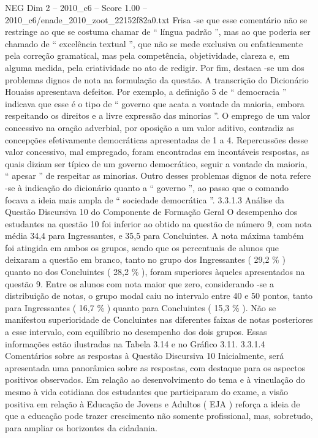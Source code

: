 \begin{textsample}{NEG Dim 2 – 2010\_c6 – Score 1.00 – 2010\_c6/enade\_2010\_zoot\_22152f82a0.txt}
Frisa -se que esse comentário não se restringe ao que se costuma chamar de “ língua padrão ”, mas ao que poderia ser chamado de “ excelência textual ”, que não se mede exclusiva ou enfaticamente pela correção gramatical, mas pela competência, objetividade, clareza e, em alguma medida, pela criatividade no ato de redigir.
Por fim, destaca -se um dos problemas dignos de nota na formulação da questão.
A transcrição do Dicionário Houaiss apresentava defeitos.
Por exemplo, a definição 5 de “ democracia ” indicava que esse é o tipo de “ governo que acata a vontade da maioria, embora respeitando os direitos e a livre expressão das minorias ”.
O emprego de um valor concessivo na oração adverbial, por oposição a um valor aditivo, contradiz as concepções efetivamente democráticas apresentadas de 1 a 4.
Repercussões desse valor concessivo, mal empregado, foram encontradas em incontáveis respostas, as quais diziam ser típico de um governo democrático, seguir a vontade da maioria, “ apesar ” de respeitar as minorias.
Outro desses problemas dignos de nota refere -se à indicação do dicionário quanto a “ governo ”, ao passo que o comando focava a ideia mais ampla de “ sociedade democrática ”. 3.3.1.3 Análise da Questão Discursiva 10 do Componente de Formação Geral O desempenho dos estudantes na questão 10 foi inferior ao obtido na questão de número 9, com nota média 34,4 para Ingressantes, e 35,5 para Concluintes.
A nota máxima também foi atingida em ambos os grupos, sendo que os percentuais de alunos que deixaram a questão em branco, tanto no grupo dos Ingressantes ( 29,2 \% ) quanto no dos Concluintes ( 28,2 \% ), foram superiores àqueles apresentados na questão 9.
Entre os alunos com nota maior que zero, considerando -se a distribuição de notas, o grupo modal caiu no intervalo entre 40 e 50 pontos, tanto para Ingressantes ( 16,7 \% ) quanto para Concluintes ( 15,3 \% ).
Não se manifestou superioridade de Concluintes nas diferentes faixas de notas posteriores a esse intervalo, com equilíbrio no desempenho dos dois grupos.
Essas informações estão ilustradas na Tabela 3.14 e no Gráfico 3.11. 3.3.1.4 Comentários sobre as respostas à Questão Discursiva 10 Inicialmente, será apresentada uma panorâmica sobre as respostas, com destaque para os aspectos positivos observados.
Em relação ao desenvolvimento do tema e à vinculação do mesmo à vida cotidiana dos estudantes que participaram do exame, a visão positiva em relação à Educação de Jovens e Adultos ( EJA ) reforça a ideia de que a educação pode trazer crescimento não somente profissional, mas, sobretudo, para ampliar os horizontes da cidadania.

\end{textsample}
